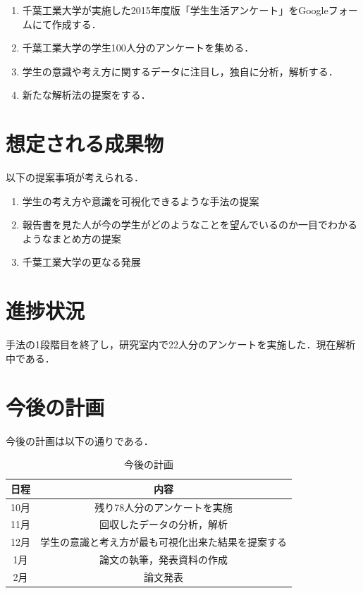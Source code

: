 \documentclass[uplatex,twocolumn,dvipdfmx]{jsarticle}
\begin{document}
\begin{enumerate}
\item 千葉工業大学が実施した2015年度版「学生生活アンケート」をGoogleフォームにて作成する．
\item 千葉工業大学の学生100人分のアンケートを集める．
\item 学生の意識や考え方に関するデータに注目し，独自に分析，解析する．
\item 新たな解析法の提案をする．
\end{enumerate}

\section{想定される成果物}
以下の提案事項が考えられる．
\begin{enumerate}
\item 学生の考え方や意識を可視化できるような手法の提案
\item 報告書を見た人が今の学生がどのようなことを望んでいるのか一目でわかるようなまとめ方の提案
\item 千葉工業大学の更なる発展
\end{enumerate}

\section{進捗状況}
手法の1段階目を終了し，研究室内で22人分のアンケートを実施した．現在解析中である．
\section{今後の計画}

今後の計画は以下の通りである．
\begin{table}[hbtp]
  \caption{今後の計画}
  \label{table:data_type}
  \centering
  \begin{tabular}{cc}
    \hline
    日程 & 内容  \\ \hline \hline
    10月 & 残り78人分のアンケートを実施 \\
    11月 & 回収したデータの分析，解析 \\
    12月 & 学生の意識と考え方が最も可視化出来た結果を提案する \\
    1月 & 論文の執筆，発表資料の作成 \\
2月 & 論文発表\\
 \hline
  \end{tabular}
\end{table}



\end{document}
